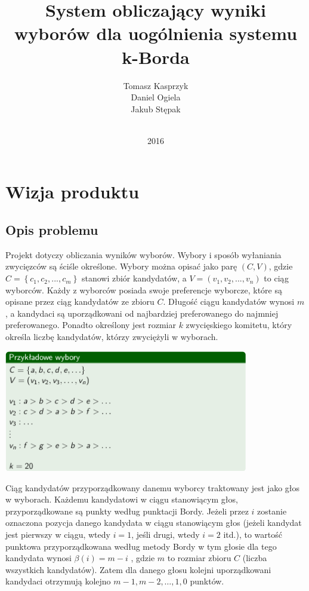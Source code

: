 \documentclass[polish,11pt]{aghthesis}
\author{Tomasz Kasprzyk\\ Daniel Ogiela\\ Jakub Stępak \\ \ }
\title{System obliczający wyniki wyborów dla uogólnienia systemu k-Borda}
\date{2016}
\begin{document}
\maketitle
\tableofcontents
\clearpage


\section{Wizja produktu}

\subsection{Opis problemu}
\label{opis_problemu}
Projekt dotyczy obliczania wyników wyborów. Wybory i sposób wyłaniania zwycięzców są
ściśle określone. Wybory można opisać jako parę $(C, V)$, gdzie $C = \left\{c_1, c_2, ... , c_m\right\}$ stanowi zbiór kandydatów, a $V = \left(v_1, v_2, ... , v_n\right)$ to ciąg wyborców. Każdy z wyborców posiada swoje preferencje wyborcze, które są opisane przez ciąg kandydatów ze zbioru $C$. Długość ciągu kandydatów wynosi $m$, a kandydaci są uporządkowani od najbardziej preferowanego do najmniej preferowanego. Ponadto określony jest rozmiar $k$ zwycięskiego komitetu, który określa liczbę kandydatów, którzy zwyciężyli w wyborach.

\begin{center}
\includegraphics[width=0.8\textwidth]{pics/przykladowe_wybory.png}
\end{center}
Ciąg kandydatów przyporządkowany danemu wyborcy traktowany jest jako głos w
wyborach. Każdemu kandydatowi w ciągu stanowiącym głos, przyporządkowane są punkty
według punktacji Bordy. Jeżeli przez $i$ zostanie oznaczona pozycja danego kandydata w
ciągu stanowiącym głos (jeżeli kandydat jest pierwszy w ciągu, wtedy $i = 1$, jeśli drugi, wtedy $i = 2$ itd.), to wartość punktowa przyporządkowana według metody Bordy w tym głosie dla tego kandydata wynosi $\beta(i) = m - i$ , gdzie $m$ to rozmiar zbioru $C$ (liczba wszystkich kandydatów). Zatem dla danego głosu kolejni uporządkowani kandydaci otrzymują kolejno $m - 1, m - 2, … , 1, 0$ punktów.
\end{document}
